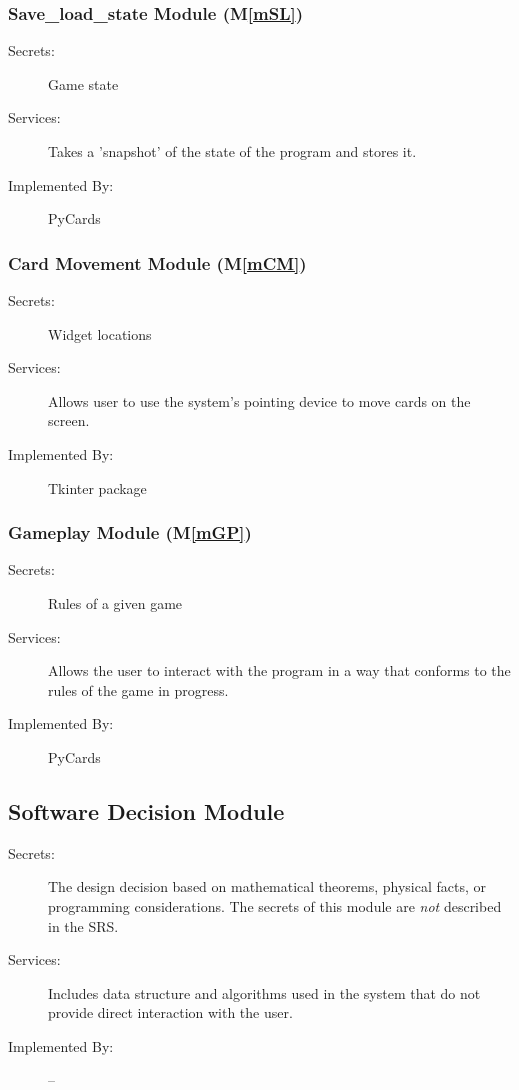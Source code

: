 \documentclass[12pt, titlepage]{article}
\newcommand{\mref}[1]{M\ref{#1}}
\begin{document}
	\subsubsection{Save\_load\_state Module (\mref{mSL})}
	\begin{description}
		\item[Secrets:]Game state
		\item[Services:]Takes a 'snapshot' of the state of the program and 
		stores it.
		\item[Implemented By:] PyCards
	\end{description}
	\subsubsection{Card Movement Module (\mref{mCM})}
	\begin{description}
		\item[Secrets:]Widget locations
		\item[Services:]Allows user to use the system's pointing device to move 
		cards on the screen.
		\item[Implemented By:] Tkinter package
	\end{description}
	\subsubsection{Gameplay Module (\mref{mGP})}
	\begin{description}
		\item[Secrets:]Rules of a given game
		\item[Services:]Allows the user to interact with the program in a way 
		that conforms to the rules of the game in progress.
		\item[Implemented By:] PyCards
	\end{description}
	\subsection{Software Decision Module}
	\begin{description}
		\item[Secrets:] The design decision based on mathematical theorems, 
		physical facts, or programming considerations. The secrets of this 
		module are
		\emph{not} described in the SRS.
		\item[Services:] Includes data structure and algorithms used in the 
		system that do not provide direct interaction with the user. 
		\item[Implemented By:] --
	\end{description}
	
\end{document}

